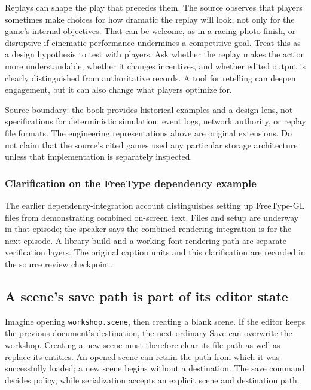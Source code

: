 Replays can shape the play that precedes them. The source observes that players sometimes make choices for how dramatic the replay will look, not only for the game's internal objectives. That can be welcome, as in a racing photo finish, or disruptive if cinematic performance undermines a competitive goal. Treat this as a design hypothesis to test with players. Ask whether the replay makes the action more understandable, whether it changes incentives, and whether edited output is clearly distinguished from authoritative records. A tool for retelling can deepen engagement, but it can also change what players optimize for.

Source boundary: the book provides historical examples and a design lens, not specifications for deterministic simulation, event logs, network authority, or replay file formats. The engineering representations above are original extensions. Do not claim that the source's cited games used any particular storage architecture unless that implementation is separately inspected.

\subsubsection{Clarification on the FreeType dependency example}\label{06-engine-ii-ch046-clarification-on-the-freetype-dependency-example}

The earlier dependency-integration account distinguishes setting up FreeType-GL files from demonstrating combined on-screen text. Files and setup are underway in that episode; the speaker says the combined rendering integration is for the next episode. A library build and a working font-rendering path are separate verification layers. The original caption units and this clarification are recorded in the source review checkpoint.

\subsection{A scene's save path is part of its editor state}\label{06-engine-ii-ch046-a-scenes-save-path-is-part-of-its-editor-state}

Imagine opening \texttt{workshop.scene}, then creating a blank scene. If the editor keeps the previous document's destination, the next ordinary Save can overwrite the workshop. Creating a new scene must therefore clear its file path as well as replace its entities. An opened scene can retain the path from which it was successfully loaded; a new scene begins without a destination. The save command decides policy, while serialization accepts an explicit scene and destination path.


